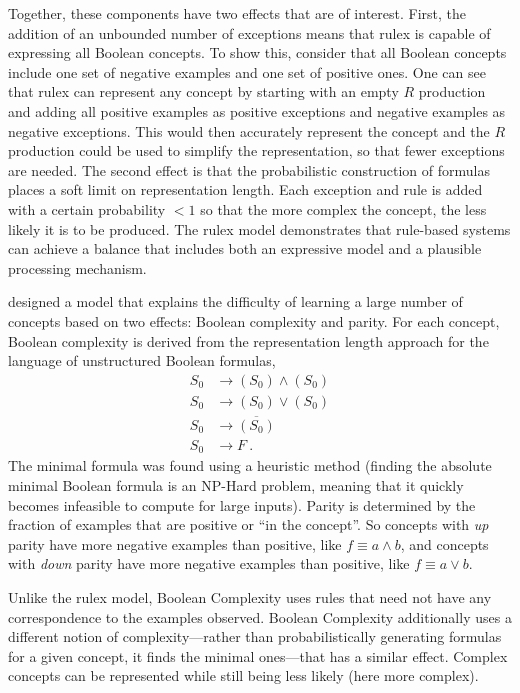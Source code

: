 \documentclass[doc,floatsintext]{apa6}
\begin{document}
Together, these components have two effects that are of interest. First, the addition of an unbounded number of exceptions means that \ac{rulex} is capable of expressing all Boolean concepts. To show this, consider that all Boolean concepts include one set of negative examples and one set of positive  ones. One can see that \ac{rulex} can represent any concept by starting with an empty $R$ production and adding all positive examples as positive exceptions and negative examples as negative exceptions. This would then accurately represent the concept and the $R$ production could be used to simplify the representation, so that fewer exceptions are needed. The second effect is that the probabilistic construction of formulas places a soft limit on representation length. Each exception and rule is added with a certain probability $<1$ so that the more complex the concept, the less likely it is to be produced.
The \ac{rulex} model demonstrates that rule-based systems can achieve a balance that includes both an expressive model and a plausible processing mechanism.

\citet{feldman2000} designed a model that explains the difficulty of learning a large number of concepts based on two effects: Boolean complexity and parity.
For each concept, Boolean complexity is derived from the representation length approach for the language of unstructured Boolean formulas,
%
\begin{align*}
  S_0 &\rightarrow (S_0) \wedge (S_0) \\
  S_0 &\rightarrow (S_0) \vee (S_0) \\
  S_0 &\rightarrow \overline{(S_0)} \\
  S_0 &\rightarrow F ~.
\end{align*}
%
The minimal formula was found using a heuristic method (finding the absolute minimal Boolean formula is an NP-Hard problem, meaning that it quickly becomes infeasible to compute for large inputs).
Parity is determined by the fraction of examples that are positive or ``in the concept''.
So concepts with \emph{up} parity have more negative examples than positive, like $f \equiv a \wedge b$, and concepts with \emph{down} parity have more negative examples than positive, like $f \equiv a \vee b$.

Unlike the \ac{rulex} model, Boolean Complexity uses rules that need not have any correspondence to the examples observed. Boolean Complexity additionally uses a different notion of complexity---rather than probabilistically generating formulas for a given concept, it finds the minimal ones---that has a similar effect. Complex concepts can be represented while still being less likely (here more complex).
\end{document}
